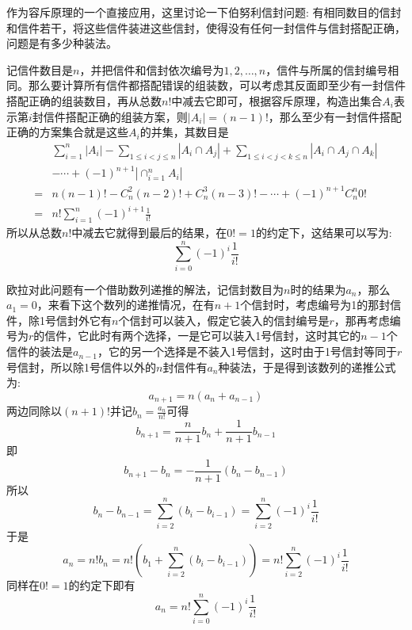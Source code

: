 \begin{example}
  作为容斥原理的一个直接应用，这里讨论一下伯努利信封问题: 有相同数目的信封和信件若干，将这些信件装进这些信封，使得没有任何一封信件与信封搭配正确，问题是有多少种装法。

  记信件数目是$n$，并把信件和信封依次编号为$1,2,\ldots,n$，信件与所属的信封编号相同。那么要计算所有信件都搭配错误的组装数，可以考虑其反面即至少有一封信件搭配正确的组装数目，再从总数$n!$中减去它即可，根据容斥原理，构造出集合$A_i$表示第$i$封信件搭配正确的组装方案，则$|A_i|=(n-1)!$，那么至少有一封信件搭配正确的方案集合就是这些$A_i$的并集，其数目是
  \begin{eqnarray*}
      &    \sum_{i=1}^n|A_i|-\sum_{1\leqslant i <j \leqslant n}|A_i \cap A_j|+\sum_{1 \leqslant i <j <k \leqslant n}|A_i\cap A_j \cap A_k| \\
      & -\cdots+(-1)^{n+1}|\cap_{i=1}^nA_i| \\
      = & n (n-1)! - C_n^2(n-2)! + C_n^3(n-3)! - \cdots + (-1)^{n+1}C_n^n0! \\
      = & n!\sum_{i=1}^n(-1)^{i+1}\frac{1}{i!}
  \end{eqnarray*}
  所以从总数$n!$中减去它就得到最后的结果，在$0!=1$的约定下，这结果可以写为:
  \begin{equation}
    \label{eq:bernoulli-envelope-problem-solution}
    \sum_{i=0}^n(-1)^i \frac{1}{i!}
  \end{equation}

  欧拉对此问题有一个借助数列递推的解法，记信封数目为$n$时的结果为$a_n$，那么$a_1=0$，来看下这个数列的递推情况，在有$n+1$个信封时，考虑编号为1的那封信件，除1号信封外它有$n$个信封可以装入，假定它装入的信封编号是$r$，那再考虑编号为$r$的信件，它此时有两个选择，一是它可以装入1号信封，这时其它的$n-1$个信件的装法是$a_{n-1}$，它的另一个选择是不装入1号信封，这时由于1号信封等同于$r$号信封，所以除1号信件以外的$n$封信件有$a_n$种装法，于是得到该数列的递推公式为:
  \begin{equation*}
    a_{n+1}=n(a_n+a_{n-1})
  \end{equation*}
  两边同除以$(n+1)!$并记$b_n=\frac{a_n}{n!}$可得
  \begin{equation*}
    b_{n+1}=\frac{n}{n+1}b_n+\frac{1}{n+1}b_{n-1}
  \end{equation*}
  即
  \begin{equation*}
    b_{n+1}-b_n=-\frac{1}{n+1}(b_n-b_{n-1})
  \end{equation*}
  所以
  \begin{equation*}
    b_n-b_{n-1}= \sum_{i=2}^{n}(b_i-b_{i-1})= \sum_{i=2}^n (-1)^{i}\frac{1}{i!}
  \end{equation*}
  于是
  \begin{equation*}
    a_n= n!b_n = n!(b_1 + \sum_{i=2}^n(b_i-b_{i-1})) = n! \sum_{i=2}^n(-1)^{i}\frac{1}{i!}
  \end{equation*}
  同样在$0!=1$的约定下即有
  \begin{equation*}
    a_n = n!\sum_{i=0}^n(-1)^{i}\frac{1}{i!}
  \end{equation*}
\end{example}

